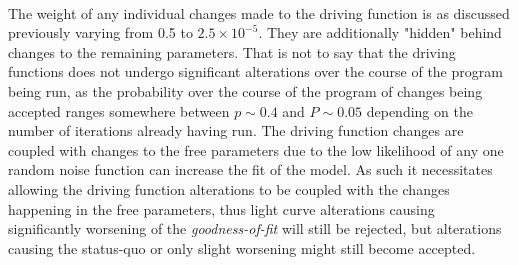 \documentclass[a4paper, 12pt, twoside]{article}
\begin{document}
\\
The weight of any individual changes made to the driving function is as discussed previously varying from 0.5 to $2.5 \times 10^{-5}$. They are additionally "hidden" behind changes to the remaining parameters. That is not to say that the driving functions does not undergo significant alterations over the course of the program being run, as the probability over the course of the program of changes being accepted ranges somewhere between $p\sim 0.4$ and $P\sim 0.05$ depending on the number of iterations already having run. The driving function changes are coupled with changes to the free parameters due to the low likelihood of any one random noise function can increase the fit of the model. As such it necessitates allowing the driving function alterations to be coupled with the changes happening in the free parameters, thus light curve alterations causing significantly worsening of the \emph{goodness-of-fit} will still be rejected, but alterations causing the status-quo or only slight worsening might still become accepted. 




\cite{Peterson2014}

\end{document}
